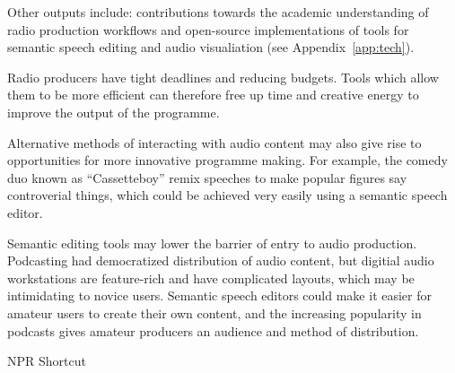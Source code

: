   Other outputs include: contributions towards the academic understanding of radio production workflows
  and open-source implementations of tools for semantic speech editing and audio visualiation (see
  Appendix~\ref{app:tech}).




  Radio producers have tight deadlines and reducing budgets. Tools which allow them to be more efficient can therefore
  free up time and creative energy to improve the output of the programme.

  Alternative methods of interacting with audio content may also give rise to opportunities for more innovative programme
  making.
  For example, the comedy duo known as ``Cassetteboy'' \citep{Perraudin2014} remix speeches to make popular figures say
  controverial things, which could be achieved very easily using a semantic speech editor.

  Semantic editing tools may lower the barrier of entry to audio production.
  Podcasting had democratized distribution of audio content, but digitial audio workstations are feature-rich
  and have complicated layouts, which may be intimidating to novice users.
  Semantic speech editors could make it easier for amateur users to create their own content, and the increasing
  popularity in podcasts gives amateur producers an audience and method of distribution.

  NPR Shortcut\citet{Friedhoff2016}


